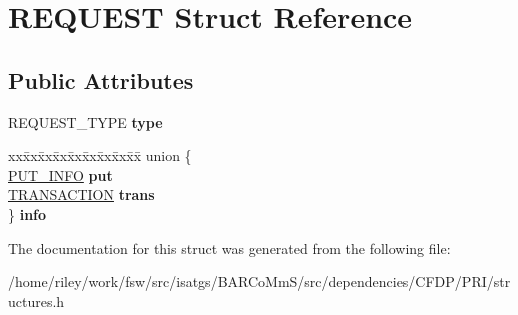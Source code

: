 \hypertarget{struct_r_e_q_u_e_s_t}{}\section{R\+E\+Q\+U\+E\+ST Struct Reference}
\label{struct_r_e_q_u_e_s_t}
\subsection*{Public Attributes}
\begin{DoxyCompactItemize}
\item 
R\+E\+Q\+U\+E\+S\+T\+\_\+\+T\+Y\+PE {\bfseries type}\hypertarget{struct_r_e_q_u_e_s_t_a0f5230fb19c5a4616098460a082d2f3a}{}\label{struct_r_e_q_u_e_s_t_a0f5230fb19c5a4616098460a082d2f3a}

\item 
\begin{tabbing}
xx\=xx\=xx\=xx\=xx\=xx\=xx\=xx\=xx\=\kill
union \{\\
\>\hyperlink{struct_p_u_t___i_n_f_o}{PUT\_INFO} {\bfseries put}\\
\>\hyperlink{struct_t_r_a_n_s_a_c_t_i_o_n}{TRANSACTION} {\bfseries trans}\\
\} {\bfseries info}\hypertarget{struct_r_e_q_u_e_s_t_afbdff347471ad0aafd436ce9679aafa4}{}\label{struct_r_e_q_u_e_s_t_afbdff347471ad0aafd436ce9679aafa4}
\\

\end{tabbing}\end{DoxyCompactItemize}


The documentation for this struct was generated from the following file\+:\begin{DoxyCompactItemize}
\item 
/home/riley/work/fsw/src/isatgs/\+B\+A\+R\+Co\+Mm\+S/src/dependencies/\+C\+F\+D\+P/\+P\+R\+I/structures.\+h\end{DoxyCompactItemize}

